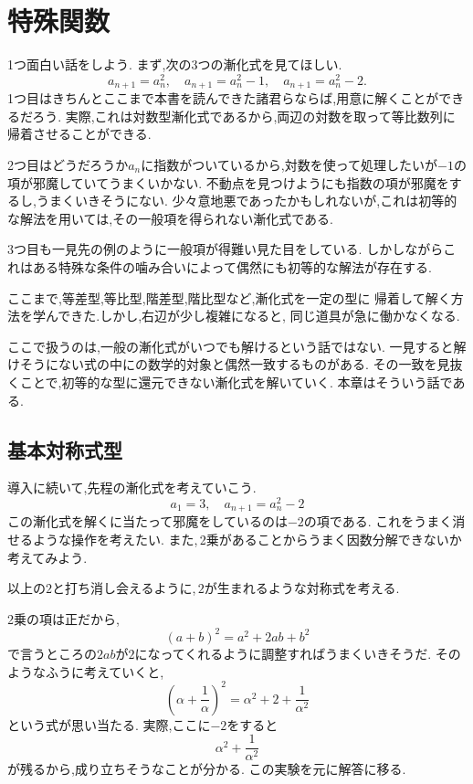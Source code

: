 
\section{特殊関数}

1つ面白い話をしよう.
まず,次の3つの漸化式を見てほしい.
\[
  a_{n+1}=a_n^2,
  \quad
  a_{n+1}=a_n^2-1,
  \quad
  a_{n+1}=a_n^2-2.
\]
1つ目はきちんとここまで本書を読んできた諸君らならば,用意に解くことができるだろう.
実際,これは対数型漸化式であるから,両辺の対数を取って等比数列に帰着させることができる.

2つ目はどうだろうか$a_n$に指数がついているから,対数を使って処理したいが$-1$の項が邪魔していてうまくいかない.
不動点を見つけようにも指数の項が邪魔をするし,うまくいきそうにない.
少々意地悪であったかもしれないが,これは初等的な解法を用いては,その一般項を得られない漸化式である.

3つ目も一見先の例のように一般項が得難い見た目をしている.
しかしながらこれはある特殊な条件の噛み合いによって偶然にも初等的な解法が存在する.

ここまで,等差型,等比型,階差型,階比型など,漸化式を一定の型に
帰着して解く方法を学んできた.しかし,右辺が少し複雑になると,
同じ道具が急に働かなくなる.

ここで扱うのは,一般の漸化式がいつでも解けるという話ではない.
一見すると解けそうにない式の中にの数学的対象と偶然一致するものがある.
その一致を見抜くことで,初等的な型に還元できない漸化式を解いていく.
本章はそういう話である.

\subsection{基本対称式型}
導入に続いて,先程の漸化式を考えていこう.
\[
  a_1=3, \quad a_{n+1}=a_n^2-2
\]
この漸化式を解くに当たって邪魔をしているのは$-2$の項である.
これをうまく消せるような操作を考えたい.
また,\,2乗があることからうまく因数分解できないか考えてみよう.

以上の$2$と打ち消し会えるように,\,$2$が生まれるような対称式を考える.

2乗の項は正だから,
\[
  (a+b)^2=a^2+2ab+b^2
\]
で言うところの$2ab$が$2$になってくれるように調整すればうまくいきそうだ.
そのようなふうに考えていくと,
\[
  \left(\alpha+\frac{1}{\alpha}\right)^2=\alpha^2+2+\frac{1}{\alpha^2}
\]
という式が思い当たる.
実際,ここに$-2$をすると
\[
  \alpha^2+\frac{1}{\alpha^2}
\]
が残るから,成り立ちそうなことが分かる.
この実験を元に解答に移る.

